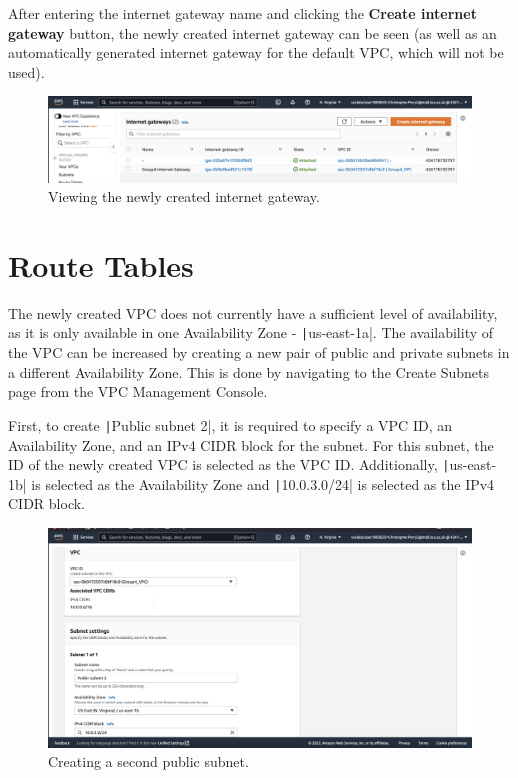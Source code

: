 After entering the internet gateway name and clicking the \textbf{Create internet gateway} button, the newly created
internet gateway can be seen (as well as an automatically generated internet gateway for the default VPC, which will not
be used).

\begin{figure}[!htbp]
    \centering
    \includegraphics[width=150mm]{resources/vpc/internet-gateway-2}
    \caption{Viewing the newly created internet gateway.}
    \label{fig:internet-gateway-2}
\end{figure}

\clearpage
\section{Route Tables}\label{sec:route-tables}

The newly created VPC does not currently have a sufficient level of availability, as it is only available in one
Availability Zone - \texttt|us-east-1a|.
The availability of the VPC can be increased by creating a new pair of public and private subnets in a different
Availability Zone.
This is done by navigating to the Create Subnets page from the VPC Management Console.

First, to create \texttt|Public subnet 2|, it is required to specify a VPC ID, an Availability Zone, and an
IPv4 CIDR block for the subnet.
For this subnet, the ID of the newly created VPC is selected as the VPC ID\@.
Additionally, \texttt|us-east-1b| is selected as the Availability Zone and
\texttt|10.0.3.0/24| is selected as the IPv4 CIDR block.

\begin{figure}[!htbp]
    \centering
    \includegraphics[width=125mm]{resources/vpc/routes/vpc-public-subnet-2}
    \caption{Creating a second public subnet.}
    \label{fig:vpc-public-subnet-2}
\end{figure}

